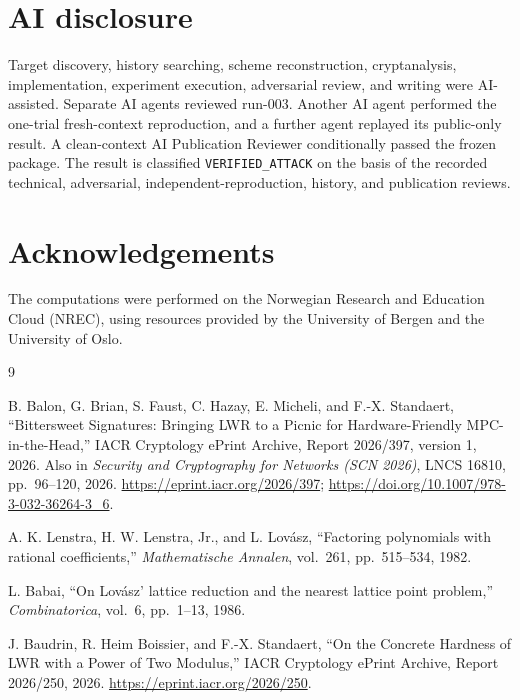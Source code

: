 \documentclass[10pt,a4paper]{article}
\begin{document}
\section{AI disclosure}

Target discovery, history searching, scheme reconstruction,
cryptanalysis, implementation, experiment execution, adversarial review, and
writing were AI-assisted.  Separate AI agents reviewed run-003.  Another AI
agent performed the one-trial fresh-context reproduction, and a further agent
replayed its public-only result.  A clean-context AI Publication Reviewer
conditionally passed the frozen package. The result is classified
\texttt{VERIFIED\_ATTACK} on the basis of the recorded technical, adversarial,
independent-reproduction, history, and publication reviews.

\section*{Acknowledgements}

The computations were performed on the Norwegian Research and Education Cloud (NREC), using resources provided by the University of Bergen and the University of Oslo.

\begin{thebibliography}{9}

B. Balon, G. Brian, S. Faust, C. Hazay, E. Micheli, and F.-X. Standaert,
``Bittersweet Signatures: Bringing LWR to a Picnic for Hardware-Friendly
MPC-in-the-Head,'' IACR Cryptology ePrint Archive, Report 2026/397, version 1,
2026.  Also in \emph{Security and Cryptography for Networks (SCN 2026)},
LNCS 16810, pp.~96--120, 2026.
\url{https://eprint.iacr.org/2026/397};
\url{https://doi.org/10.1007/978-3-032-36264-3_6}.

A. K. Lenstra, H. W. Lenstra, Jr., and L. Lov\'asz,
``Factoring polynomials with rational coefficients,''
\emph{Mathematische Annalen}, vol.~261, pp.~515--534, 1982.

L. Babai,
``On Lov\'asz' lattice reduction and the nearest lattice point problem,''
\emph{Combinatorica}, vol.~6, pp.~1--13, 1986.

J. Baudrin, R. Heim Boissier, and F.-X. Standaert,
``On the Concrete Hardness of LWR with a Power of Two Modulus,''
IACR Cryptology ePrint Archive, Report 2026/250, 2026.
\url{https://eprint.iacr.org/2026/250}.

\end{thebibliography}
\end{document}
